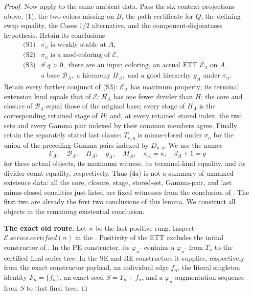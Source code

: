 \begin{proof}
Now apply  to the same ambient data.
Pass the six context projections above, (1), the two colors missing on
\(B\), the path certificate for \(Q\), the defining swap equality, the
Cases 1/2 alternative, and the component-disjointness hypothesis.  Retain
its conclusions
\[
\begin{array}{ll}
\text{(S1)}&\sigma_n\text{ is weakly stable at }A,\\
\text{(S2)}&\sigma_n\text{ is a mod-coloring of }\mathcal E,\\
\text{(S3)}&\text{if }q>0,\text{ there are an input coloring, an actual
 ETT }\mathcal E_A\text{ on }A,\\
&\text{a base }\mathcal B_A,\text{ a hierarchy }H_A,\text{ and a good
 hierarchy }g_A\text{ under }\sigma_n.
\end{array}                                                     \tag{4}
\]
Retain every further conjunct of (S3): \(\mathcal E_A\) has maximum
property; its terminal extension kind equals that of \(\mathcal E\);
\(H_A\) has one fewer divider than \(H\); the core and closure of
\(\mathcal B_A\) equal those of the original base; every stage of
\(H_A\) is the corresponding retained stage of \(H\); and, at every
retained stored index, the two  sets
and every Gamma pair indexed by their common members agree.  Finally
retain the separately stated last clause: \(T_{n,q}\) is minus-closed
under \(\sigma_n\) for the union of the preceding Gamma pairs indexed
by \(D_{n,q}\).  We use the names
\[
 \mathcal E_A,\quad \mathcal B_A,\quad H_A,\quad g_A,
 \quad M_A,\quad \kappa_A=\kappa,
 \quad d_A+1=q                                             \tag{4a}
\]
for these actual objects, its maximum witness, its terminal-kind
equality, and its divider-count equality, respectively.  Thus (4a) is
not a summary of unnamed existence data: all the core, closure, stage,
stored-set, Gamma-pair, and last minus-closed equalities just listed are
fixed witnesses from the conclusion of
.
The first two are already the first two conclusions of this lemma.  We
construct all objects in the remaining existential conclusion.

\textbf{The exact old route.}
Let \(n\) be the last positive rung.  Inspect
\(\mathcal E.\mathit{series}.\mathit{certified}(n)\) in the
.  Positivity of the ETT excludes the initial
constructor of .  In the PE constructor, its
\(\varphi_n\)- contains a
\(\varphi_n\)- from \(T_n\) to the
certified final series tree.  In the SE and RE constructors it supplies,
respectively from the exact constructor payload, an individual edge
\(f_n\), the literal singleton identity \(F_n=\{f_n\}\), an exact
 seed \(S=T_n+f_n\), and a
\(\varphi_n\)-augmentation sequence from \(S\) to that final tree.


\end{proof}

